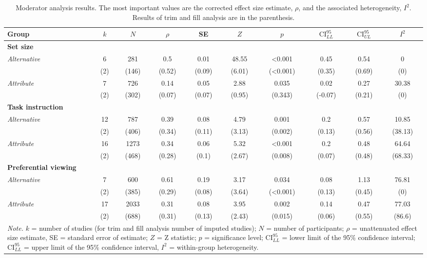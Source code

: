 \begin{table}[ht]
\centering
\caption{Moderator analysis results. The most important values are the corrected effect size estimate, $\rho$, and the associated heterogeneity, $I^2$. Results of trim and fill analysis are in the parenthesis.} 
\label{tab:mod_results}
\begingroup\small
\begin{tabular}{lccccccccc}
  \hline
Group & $k$ & $N$ & $\rho$ & SE & $Z$ & $p$ & $\textrm{CI}^{95}_{LL}$ & $\textrm{CI}^{95}_{UL}$ & $I^2$ \\ 
  \hline
\textbf{Set size} &  &  &  &  &  &  &  &  &  \\ 
  \hspace{2mm}\textit{Alternative} & 6 & 281 & 0.5 & 0.01 & 48.55 & <0.001 & 0.45 & 0.54 & 0 \\ 
   & (2) & (146) & (0.52) & (0.09) & (6.01) & (<0.001) & (0.35) & (0.69) & (0) \\ 
  \hspace{2mm}\textit{Attribute} & 7 & 726 & 0.14 & 0.05 & 2.88 & 0.035 & 0.02 & 0.27 & 30.38 \\ 
   & (2) & (302) & (0.07) & (0.07) & (0.95) & (0.343) & (-0.07) & (0.21) & (0) \\ 
  \textbf{Task instruction} &  &  &  &  &  &  &  &  &  \\ 
  \hspace{2mm}\textit{Alternative} & 12 & 787 & 0.39 & 0.08 & 4.79 & 0.001 & 0.2 & 0.57 & 10.85 \\ 
   & (2) & (406) & (0.34) & (0.11) & (3.13) & (0.002) & (0.13) & (0.56) & (38.13) \\ 
  \hspace{2mm}\textit{Attribute} & 16 & 1273 & 0.34 & 0.06 & 5.32 & <0.001 & 0.2 & 0.48 & 64.64 \\ 
   & (2) & (468) & (0.28) & (0.1) & (2.67) & (0.008) & (0.07) & (0.48) & (68.33) \\ 
  \textbf{Preferential viewing} &  &  &  &  &  &  &  &  &  \\ 
  \hspace{2mm}\textit{Alternative} & 7 & 600 & 0.61 & 0.19 & 3.17 & 0.034 & 0.08 & 1.13 & 76.81 \\ 
   & (2) & (385) & (0.29) & (0.08) & (3.64) & (<0.001) & (0.13) & (0.45) & (0) \\ 
  \hspace{2mm}\textit{Attribute} & 17 & 2033 & 0.31 & 0.08 & 3.95 & 0.002 & 0.14 & 0.47 & 77.03 \\ 
   & (2) & (688) & (0.31) & (0.13) & (2.43) & (0.015) & (0.06) & (0.55) & (86.6) \\ 
   \hline 
 \multicolumn{10}{p{0.9\textwidth}}{\scriptsize{\textit{Note.} $k$ = number of studies (for trim and fill analysis number of imputed studies); $N$ = number of participants; $\rho$ = unattenuated effect size estimate, SE = standard error of estimate; $Z$ = Z statistic; $p$ = significance level; $\textrm{CI}^{95}_{LL}$ = lower limit of the 95\% confidence interval; $\textrm{CI}^{95}_{LL}$ = upper limit of the 95\% confidence interval, $I^2$ = within-group heterogeneity.}} 
\end{tabular}
\endgroup
\end{table}

